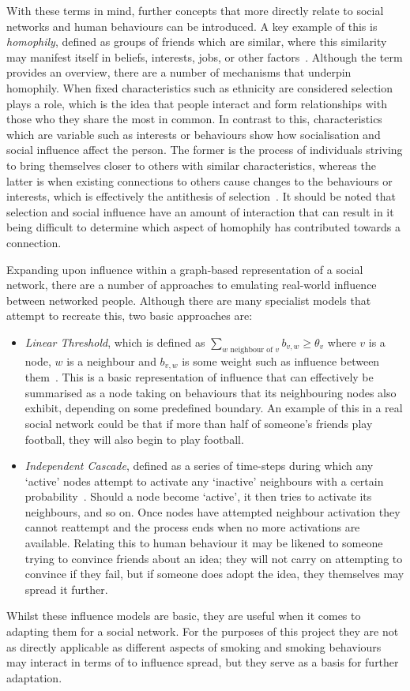 \documentclass[]{report}
\begin{document}
With these terms in mind, further concepts that more directly relate to social networks and human behaviours can be introduced. A key example of this is \emph{homophily}, defined as groups of friends which are similar, where this similarity may manifest itself in beliefs, interests, jobs, or other factors~\cite{USN-18}. Although the term provides an overview, there are a number of mechanisms that underpin homophily. When fixed characteristics such as ethnicity are considered selection plays a role, which is the idea that people interact and form relationships with those who they share the most in common. In contrast to this, characteristics which are variable such as interests or behaviours show how socialisation and social influence affect the person. The former is the process of individuals striving to bring themselves closer to others with similar characteristics, whereas the latter is when existing connections to others cause changes to the behaviours or interests, which is effectively the antithesis of selection~\cite{NetMark-81}. It should be noted that selection and social influence have an amount of interaction that can result in it being difficult to determine which aspect of homophily has contributed towards a connection.

Expanding upon influence within a graph-based representation of a social network, there are a number of approaches to emulating real-world influence between networked people. Although there are many specialist models that attempt to recreate this, two basic approaches are:
\begin{itemize}
\item \emph{Linear Threshold}, which is defined as $\sum\limits_{w \text{ neighbour of } v}^{} b_{v,w} \geq \theta_{v} $ where $v$ is a node, $w$ is a neighbour and $b_{v,w}$ is some weight such as influence between them~\cite{inf-papers}. This is a basic representation of influence that can effectively be summarised as a node taking on behaviours that its neighbouring nodes also exhibit, depending on some predefined boundary. An example of this in a real social network could be that if more than half of someone's friends play football, they will also begin to play football.
\item \emph{Independent Cascade}, defined as a series of time-steps during which any `active' nodes attempt to activate any `inactive' neighbours with a certain probability~\cite{inf-papers}. Should a node become `active', it then tries to activate its neighbours, and so on. Once nodes have attempted neighbour activation they cannot reattempt and the process ends when no more activations are available. Relating this to human behaviour it may be likened to someone trying to convince friends about an idea; they will not carry on attempting to convince if they fail, but if someone does adopt the idea, they themselves may spread it further.
\end{itemize}
Whilst these influence models are basic, they are useful when it comes to adapting them for a social network. For the purposes of this project they are not as directly applicable as different aspects of smoking and smoking behaviours may interact in terms of to influence spread, but they serve as a basis for further adaptation.
\end{document}
